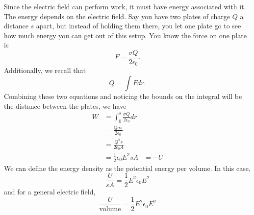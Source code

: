 \documentclass[nobib]{tufte-handout}
\begin{document}
Since the electric field can perform work, it must have
energy associated with it. The energy depends on the electric field. 
Say you have two plates of charge $Q$ a distance $s$ apart, but instead of 
holding them there, you let one plate go to see how much energy 
you can get out of this setup. You know the force on one plate is 
\[F = \frac{\sigma Q}{2 \epsilon_0}.\]
Additionally, we recall that 
\[Q = \int F dr.\]
Combining these two equations and noticing the bounds on the integral 
will be the distance between the plates, we have 
\begin{align*}
    W &= \int_{0}^{s} \frac{\sigma Q}{2 \epsilon_0} dr \\
    &= \frac{Q\sigma s}{2 \epsilon_0} \\
    &= \frac{Q^2 s}{2 \epsilon_0 A} \\
    &= \frac{1}{2} \epsilon_0 E^2 s A
    &= -U
\end{align*}
We can define the energy density as the potential energy per 
volume. In this case, 
\[\frac{U}{s A} = \frac{1}{2} E^2 \epsilon_0 E^2\]
and for a general electric field, 
\[\frac{U}{\text{volume}} = \frac{1}{2} E^2 \epsilon_0 E^2\]

\pagebreak 
\end{document}
